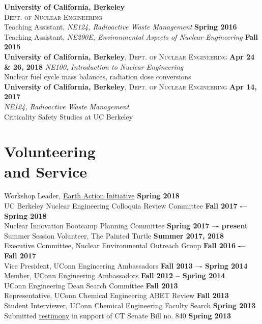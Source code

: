 \documentclass[margin,line]{resume}
\begin{document}
\begin{resume}
\textbf{University of California, Berkeley} \\
\textsc{Dept. of Nuclear Engineering} \\ 
Teaching Assistant, \textsl{NE124, Radioactive Waste Management} 
    \hfill \textbf{Spring 2016} \\
Teaching Assistant, \textsl{NE290E, Environmental Aspects of Nuclear Engineering} \hfill \textbf{Fall 2015} \vspace{6mm}\\
\textbf{University of California, Berkeley}, \textsc{Dept. of Nuclear Engineering} 
    \hfill \textbf{Apr 24 \& 26, 2018}
    \textsl{NE100, Introduction to Nuclear Engineering} \\
    Nuclear fuel cycle mass balances, radiation dose conversions
    \vspace{2mm} \\ 
\textbf{University of California, Berkeley}, \textsc{Dept. of Nuclear Engineering} \hfill \textbf{Apr 14, 2017} \\
    \textsl{NE124, Radioactive Waste Management} \\
    Criticality Safety Studies at UC Berkeley \\
    

\section{\mysidestyle Volunteering\\and Service}

Workshop Leader, \href{https://www.earthactioninitiative.org/}{Earth Action Initiative}
    \hfill \textbf{Spring 2018} \\
UC Berkeley Nuclear Engineering Colloquia Review Committee 
    \hfill \textbf{Fall 2017 -– Spring 2018} \\
Nuclear Innovation Bootcamp Planning Committee	
    \hfill \textbf{Spring 2017 –- present} \\
Summer Session Volunteer, The Painted Turtle
    \hfill \textbf{Summer 2017, 2018} \\
Executive Committee, Nuclear Environmental Outreach Group
    \hfill \textbf{Fall 2016 -– Fall 2017} \\
Vice President, UConn Engineering Ambassadors
    \hfill \textbf{Fall 2013 –- Spring 2014} \\
Member, UConn Engineering Ambassadors
    \hfill \textbf{Fall 2012 – Spring 2014} \\
UConn Engineering Dean Search Committee
    \hfill \textbf{Fall 2013} \\
Representative, UConn Chemical Engineering ABET Review
    \hfill \textbf{Fall 2013} \\
Student Interviewer, UConn Chemical Engineering Faculty Search
    \hfill \textbf{Spring 2013} \\
Submitted \href{https://www.cga.ct.gov/2013/FINdata/Tmy/2013SB-00840-R000304-Milos\%20Atz,\%20Student,\%20UConn-TMY.PDF}{testimony} in support of CT Senate Bill no. 840
    \hfill \textbf{Spring 2013} \\ %


\end{resume}
\end{document}
